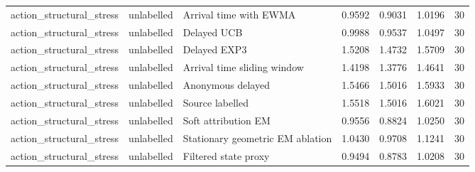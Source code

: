 \begin{tabular}{llllllr}
action\_structural\_stress & unlabelled & Arrival time with EWMA & 0.9592 & 0.9031 & 1.0196 & 30 \\
action\_structural\_stress & unlabelled & Delayed UCB & 0.9988 & 0.9537 & 1.0497 & 30 \\
action\_structural\_stress & unlabelled & Delayed EXP3 & 1.5208 & 1.4732 & 1.5709 & 30 \\
action\_structural\_stress & unlabelled & Arrival time sliding window & 1.4198 & 1.3776 & 1.4641 & 30 \\
action\_structural\_stress & unlabelled & Anonymous delayed & 1.5466 & 1.5016 & 1.5933 & 30 \\
action\_structural\_stress & unlabelled & Source labelled & 1.5518 & 1.5016 & 1.6021 & 30 \\
action\_structural\_stress & unlabelled & Soft attribution EM & 0.9556 & 0.8824 & 1.0250 & 30 \\
action\_structural\_stress & unlabelled & Stationary geometric EM ablation & 1.0430 & 0.9708 & 1.1241 & 30 \\
action\_structural\_stress & unlabelled & Filtered state proxy & 0.9494 & 0.8783 & 1.0208 & 30 \\
\bottomrule
\end{tabular}
